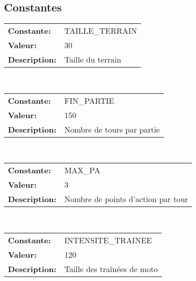 

%
%

\subsection{Constantes}

\noindent \begin{tabular}{lp{15cm}}
\textbf{Constante:} & TAILLE\_TERRAIN \\
\textbf{Valeur:} & 30 \\
\textbf{Description:} & Taille du terrain \\
\end{tabular} 
\vspace{0.2cm} \\



\noindent \begin{tabular}{lp{15cm}}
\textbf{Constante:} & FIN\_PARTIE \\
\textbf{Valeur:} & 150 \\
\textbf{Description:} & Nombre de tours par partie \\
\end{tabular} 
\vspace{0.2cm} \\



\noindent \begin{tabular}{lp{15cm}}
\textbf{Constante:} & MAX\_PA \\
\textbf{Valeur:} & 3 \\
\textbf{Description:} & Nombre de points d'action par tour \\
\end{tabular} 
\vspace{0.2cm} \\



\noindent \begin{tabular}{lp{15cm}}
\textbf{Constante:} & INTENSITE\_TRAINEE \\
\textbf{Valeur:} & 120 \\
\textbf{Description:} & Taille des traînées de moto \\
\end{tabular} 
\vspace{0.2cm} \\




